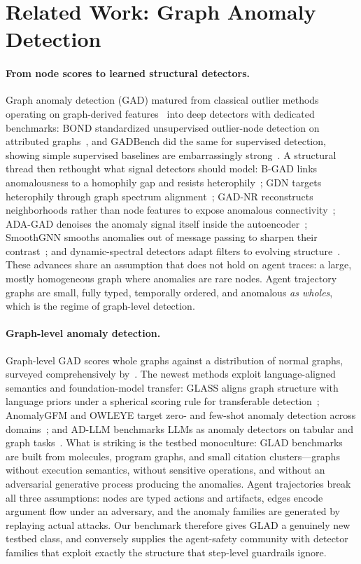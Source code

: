 \section{Related Work: Graph Anomaly Detection}
\label{sec:related-gad}

\paragraph{From node scores to learned structural detectors.} Graph anomaly detection (GAD) matured from classical outlier methods operating on graph-derived features~\cite{zhao2019pyod,liu2022pygod} into deep detectors with dedicated benchmarks: BOND standardized unsupervised outlier-node detection on attributed graphs~\cite{liu2022bond}, and GADBench did the same for supervised detection, showing simple supervised baselines are embarrassingly strong~\cite{tang2023gadbench}. A structural thread then rethought what signal detectors should model: B-GAD links anomalousness to a homophily gap and resists heterophily~\cite{tang2022rethinking}; GDN targets heterophily through graph spectrum alignment~\cite{gao2023addressing}; GAD-NR reconstructs neighborhoods rather than node features to expose anomalous connectivity~\cite{roy2024gadnr}; ADA-GAD denoises the anomaly signal itself inside the autoencoder~\cite{he2024adagad}; SmoothGNN smooths anomalies out of message passing to sharpen their contrast~\cite{dong2025smoothgnn}; and dynamic-spectral detectors adapt filters to evolving structure~\cite{zheng2025dynamic}. These advances share an assumption that does not hold on agent traces: a large, mostly homogeneous graph where anomalies are rare nodes. Agent trajectory graphs are small, fully typed, temporally ordered, and anomalous \emph{as wholes}, which is the regime of graph-level detection.

\paragraph{Graph-level anomaly detection.} Graph-level GAD scores whole graphs against a distribution of normal graphs, surveyed comprehensively by~\cite{qiao2024deep}. The newest methods exploit language-aligned semantics and foundation-model transfer: GLASS aligns graph structure with language priors under a spherical scoring rule for transferable detection~\cite{wang2026glass}; AnomalyGFM and OWLEYE target zero- and few-shot anomaly detection across domains~\cite{qiao2025anomalygfm,zheng2026owleye}; and AD-LLM benchmarks LLMs as anomaly detectors on tabular and graph tasks~\cite{yang2024adllm}. What is striking is the testbed monoculture: GLAD benchmarks are built from molecules, program graphs, and small citation clusters---graphs without execution semantics, without sensitive operations, and without an adversarial generative process producing the anomalies. Agent trajectories break all three assumptions: nodes are typed actions and artifacts, edges encode argument flow under an adversary, and the anomaly families are generated by replaying actual attacks. Our benchmark therefore gives GLAD a genuinely new testbed class, and conversely supplies the agent-safety community with detector families that exploit exactly the structure that step-level guardrails ignore.

